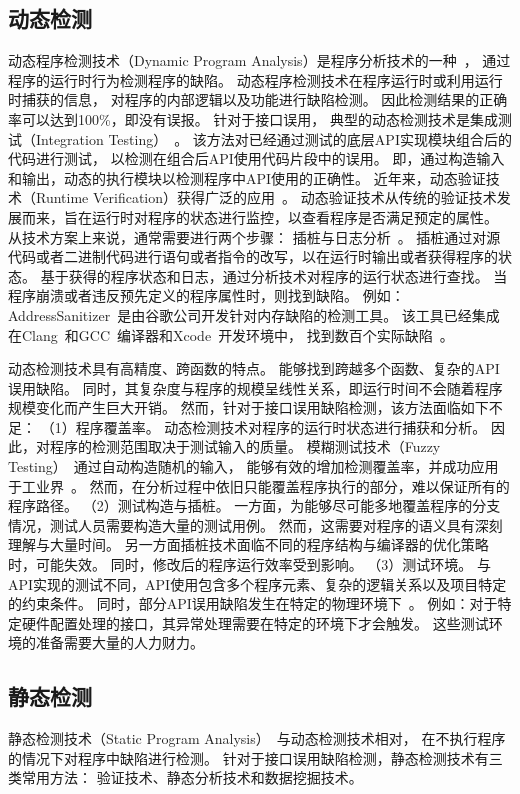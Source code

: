 \subsection{动态检测}
动态程序检测技术（Dynamic Program Analysis）是程序分析技术的一种~\cite{15-pa}，
通过程序的运行时行为检测程序的缺陷。
动态程序检测技术在程序运行时或利用运行时捕获的信息，
对程序的内部逻辑以及功能进行缺陷检测。
因此检测结果的正确率可以达到100\%，即没有误报。
针对于接口误用，
典型的动态检测技术是集成测试（Integration Testing）~\cite{02-icis-integration-testing}。
该方法对已经通过测试的底层API实现模块组合后的代码进行测试，
以检测在组合后API使用代码片段中的误用。
即，通过构造输入和输出，动态的执行模块以检测程序中API使用的正确性。
近年来，动态验证技术（Runtime Verification）获得广泛的应用~\cite{18-rv}。
动态验证技术从传统的验证技术发展而来，旨在运行时对程序的状态进行监控，以查看程序是否满足预定的属性。
从技术方案上来说，通常需要进行两个步骤：
插桩与日志分析~\cite{07-acm-valgrind, 91-purify, 12-atc-AddressSanitizer}。
插桩通过对源代码或者二进制代码进行语句或者指令的改写，以在运行时输出或者获得程序的状态。
基于获得的程序状态和日志，通过分析技术对程序的运行状态进行查找。
当程序崩溃或者违反预先定义的程序属性时，则找到缺陷。
例如：AddressSanitizer~\cite{12-atc-AddressSanitizer}是由谷歌公司开发针对内存缺陷的检测工具。
该工具已经集成在Clang~\cite{clang}和GCC~\cite{gcc}编译器和Xcode~\cite{Xcode}开发环境中，
找到数百个实际缺陷~\cite{AddressSanitizerFoundBugs}。


动态检测技术具有高精度、跨函数的特点。
能够找到跨越多个函数、复杂的API误用缺陷。
同时，其复杂度与程序的规模呈线性关系，即运行时间不会随着程序规模变化而产生巨大开销。
然而，针对于接口误用缺陷检测，该方法面临如下不足：
（1）程序覆盖率。
动态检测技术对程序的运行时状态进行捕获和分析。
因此，对程序的检测范围取决于测试输入的质量。
模糊测试技术（Fuzzy Testing）~\cite{18-fuzz}通过自动构造随机的输入，
能够有效的增加检测覆盖率，并成功应用于工业界~\cite{18-saner-fuzz}。
然而，在分析过程中依旧只能覆盖程序执行的部分，难以保证所有的程序路径。
（2）测试构造与插桩。
一方面，为能够尽可能多地覆盖程序的分支情况，测试人员需要构造大量的测试用例。
然而，这需要对程序的语义具有深刻理解与大量时间。
另一方面插桩技术面临不同的程序结构与编译器的优化策略时，可能失效。
同时，修改后的程序运行效率受到影响。
（3）测试环境。
与API实现的测试不同，API使用包含多个程序元素、复杂的逻辑关系以及项目特定的约束条件。
同时，部分API误用缺陷发生在特定的物理环境下~\cite{15-kernel-sv}。
例如：对于特定硬件配置处理的接口，其异常处理需要在特定的环境下才会触发。
这些测试环境的准备需要大量的人力财力。

\subsection{静态检测}
静态检测技术（Static Program Analysis）~\cite{08-ieee-static}与动态检测技术相对，
在不执行程序的情况下对程序中缺陷进行检测。
针对于接口误用缺陷检测，静态检测技术有三类常用方法：
验证技术、静态分析技术和数据挖掘技术。

